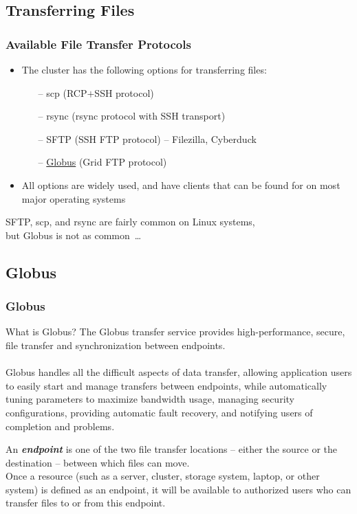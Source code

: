\subsection{Transferring Files}
\begin{frame}
	\frametitle{Available File Transfer Protocols}
	\begin{itemize}
		\item The cluster has the following options for transferring files:
		\begin{itemize}
			\item[--] scp (RCP$+$SSH protocol)
			\item[--] rsync (rsync protocol with SSH transport)
			\item[--] SFTP (SSH FTP protocol) -- Filezilla, Cyberduck
			\item[--] \href{https://www.globus.org/}{Globus} (Grid FTP protocol)
		\end{itemize}
		\item All options are widely used, and have clients that can be found for on most major operating systems
	\end{itemize}
	\btVFill
	\begin{center}
		SFTP, scp, and rsync are fairly common on Linux systems,~\\but Globus is not as common~\ldots
	\end{center}
	
\end{frame}


\subsection{Globus}
\begin{frame}
	\frametitle{Globus}
	\begin{block}{What is Globus?}\footnotesize
	The Globus transfer service provides high-performance, secure, file transfer and synchronization between endpoints.~\\~\\
	Globus handles all the difficult aspects of data transfer, allowing application users to easily start and manage transfers between endpoints, while automatically tuning parameters to maximize bandwidth usage, managing security configurations, providing automatic fault recovery, and notifying users of completion and problems. 
	\end{block}
	\begin{definition}\tiny
	An \textbf{\emph{endpoint}} is one of the two file transfer locations -- either the source or the destination -- between which files can move.~\\Once a resource (such as a server, cluster, storage system, laptop, or other system) is defined as an endpoint, it will be available to authorized users who can transfer files to or from this endpoint.
	\end{definition}
\end{frame}

